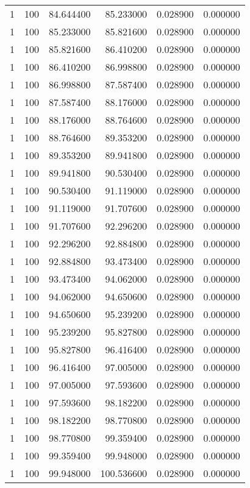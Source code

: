 \begin{longtable}{rrrrrr}
1 & 100 & 84.644400 & 85.233000 & 0.028900 & 0.000000 \\
1 & 100 & 85.233000 & 85.821600 & 0.028900 & 0.000000 \\
1 & 100 & 85.821600 & 86.410200 & 0.028900 & 0.000000 \\
1 & 100 & 86.410200 & 86.998800 & 0.028900 & 0.000000 \\
1 & 100 & 86.998800 & 87.587400 & 0.028900 & 0.000000 \\
1 & 100 & 87.587400 & 88.176000 & 0.028900 & 0.000000 \\
1 & 100 & 88.176000 & 88.764600 & 0.028900 & 0.000000 \\
1 & 100 & 88.764600 & 89.353200 & 0.028900 & 0.000000 \\
1 & 100 & 89.353200 & 89.941800 & 0.028900 & 0.000000 \\
1 & 100 & 89.941800 & 90.530400 & 0.028900 & 0.000000 \\
1 & 100 & 90.530400 & 91.119000 & 0.028900 & 0.000000 \\
1 & 100 & 91.119000 & 91.707600 & 0.028900 & 0.000000 \\
1 & 100 & 91.707600 & 92.296200 & 0.028900 & 0.000000 \\
1 & 100 & 92.296200 & 92.884800 & 0.028900 & 0.000000 \\
1 & 100 & 92.884800 & 93.473400 & 0.028900 & 0.000000 \\
1 & 100 & 93.473400 & 94.062000 & 0.028900 & 0.000000 \\
1 & 100 & 94.062000 & 94.650600 & 0.028900 & 0.000000 \\
1 & 100 & 94.650600 & 95.239200 & 0.028900 & 0.000000 \\
1 & 100 & 95.239200 & 95.827800 & 0.028900 & 0.000000 \\
1 & 100 & 95.827800 & 96.416400 & 0.028900 & 0.000000 \\
1 & 100 & 96.416400 & 97.005000 & 0.028900 & 0.000000 \\
1 & 100 & 97.005000 & 97.593600 & 0.028900 & 0.000000 \\
1 & 100 & 97.593600 & 98.182200 & 0.028900 & 0.000000 \\
1 & 100 & 98.182200 & 98.770800 & 0.028900 & 0.000000 \\
1 & 100 & 98.770800 & 99.359400 & 0.028900 & 0.000000 \\
1 & 100 & 99.359400 & 99.948000 & 0.028900 & 0.000000 \\
1 & 100 & 99.948000 & 100.536600 & 0.028900 & 0.000000 \\

\end{longtable}
